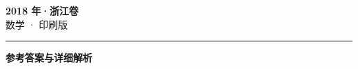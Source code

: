 \documentclass[zihao=5, a4paper]{ctexart}
\begin{document}
\begin{center}
  {\Large\bfseries 2018 年·浙江卷}\\[4pt]
  {\large 数学 · 印刷版}
\end{center}
\medskip
{}

\par\bigskip\hrule\bigskip
{}
\begin{center}{\large\bfseries 参考答案与详细解析}\end{center}
\smallskip

\end{document}
